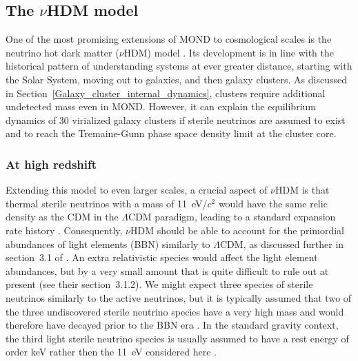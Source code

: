 \documentclass[fleqn,usenatbib,useAMS,onecolumn]{mnras} %
\begin{document}
\subsection{The \texorpdfstring{$\nu$}{v}HDM model}
\label{nuHDM}

One of the most promising extensions of MOND to cosmological scales is the neutrino hot dark matter ($\nu$HDM) model \citep{Angus_2009}. Its development is in line with the historical pattern of understanding systems at ever greater distance, starting with the Solar System, moving out to galaxies, and then galaxy clusters. As discussed in Section~\ref{Galaxy_cluster_internal_dynamics}, clusters require additional undetected mass even in MOND. However, it can explain the equilibrium dynamics of 30 virialized galaxy clusters \citep{Angus_2010} if sterile neutrinos are assumed to exist and to reach the Tremaine-Gunn phase space density limit \citep{Tremaine_Gunn_1979} at the cluster core.


\subsubsection{At high redshift}
\label{nuHDM_early}

Extending this model to even larger scales, a crucial aspect of $\nu$HDM is that thermal sterile neutrinos with a mass of 11~eV/$c^2$ would have the same relic density as the CDM in the $\Lambda$CDM paradigm, leading to a standard expansion rate history \citep{Dodelson_2006, Skordis_2006_theory, Skordis_2006}. Consequently, $\nu$HDM should be able to account for the primordial abundances of light elements (BBN) similarly to $\Lambda$CDM, as discussed further in section~3.1 of \citet{Haslbauer_2020}. An extra relativistic species would affect the light element abundances, but by a very small amount that is quite difficult to rule out at present (see their section~3.1.2). We might expect three species of sterile neutrinos similarly to the active neutrinos, but it is typically assumed that two of the three undiscovered sterile neutrino species have a very high mass and would therefore have decayed prior to the BBN era \citep[see figure~3 of][]{Ruchayskiy_2012}. In the standard gravity context, the third light sterile neutrino species is usually assumed to have a rest energy of order keV rather then the 11~eV considered here \citep{Adhikari_2017}.
\end{document}
